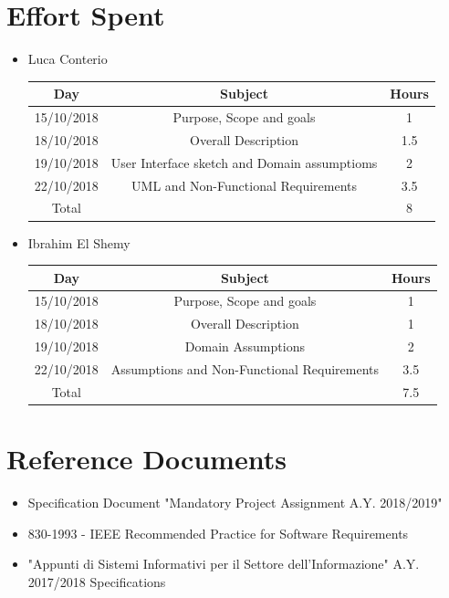 \documentclass[12pt,a4paper]{article}
\begin{document}
	\section{Effort Spent}
		\begin{itemize}
			\item Luca Conterio
			\begin{center}
				\begin{tabular}{| c | c | c |}
					\hline
					Day & Subject & Hours \\ \hline
					15/10/2018 & Purpose, Scope and goals & 1 \\
					18/10/2018 & Overall Description & 1.5 \\
                    19/10/2018  & User Interface sketch and Domain assumptioms & 2 \\
                    22/10/2018  & UML and Non-Functional Requirements & 3.5 \\
					\hline
					Total & & 8\\
					\hline
				\end{tabular}
			\end{center}
		
			\item Ibrahim El Shemy
			\begin{center}
				\begin{tabular}{| c | c | c |}
					\hline
					Day & Subject & Hours \\ \hline
					15/10/2018 & Purpose, Scope and goals & 1 \\
					18/10/2018 & Overall Description & 1 \\
         			19/10/2018  & Domain Assumptions & 2 \\
                    22/10/2018  & Assumptions and Non-Functional Requirements & 3.5 \\
					\hline
					Total & & 7.5\\
					\hline
				\end{tabular}
			\end{center}
		\end{itemize}
	\section{Reference Documents}
	\begin{itemize}
		\item Specification Document "Mandatory Project Assignment A.Y. 2018/2019"
		\item 830-1993 - IEEE Recommended Practice for Software Requirements
		\item "Appunti di Sistemi Informativi per il Settore dell'Informazione" A.Y. 2017/2018
		 Specifications
	\end{itemize}
	
\end{document}
